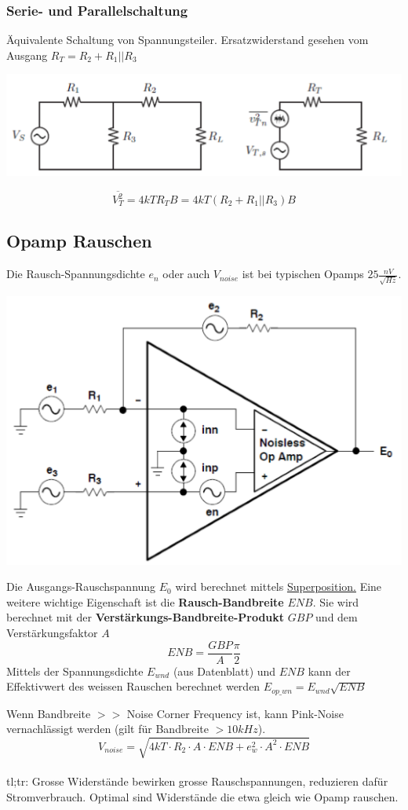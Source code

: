 \subsubsection{Serie- und Parallelschaltung}
Äquivalente Schaltung von Spannungsteiler. Ersatzwiderstand gesehen vom Ausgang $R_T = R_2 + R_1||R_3$
\begin{center}
	\includegraphics[width=0.6\columnwidth]{Images/rauschen_serie_parallel}
\end{center}
\[
\overline{V_T^2} = 4kTR_TB = 4kT(R_2 + R_1||R_3)B
\]


\subsection{Opamp Rauschen}
Die Rausch-Spannungsdichte $e_n$ oder auch $V_{noise}$ ist bei typischen Opamps $25\frac{nV}{\sqrt{Hz}}$.
\begin{center}
	\includegraphics[width=0.6\columnwidth]{Images/opamp_rauschen}
\end{center}
Die Ausgangs-Rauschspannung $E_0$ wird berechnet mittels \underline{Superposition.} Eine weitere wichtige Eigenschaft ist die \textbf{Rausch-Bandbreite} $ENB$. Sie wird berechnet mit der \textbf{Verstärkungs-Bandbreite-Produkt} $GBP$ und dem Verstärkungsfaktor $A$
\[
ENB = \frac{GBP}{A}\frac{\pi}{2}
\]
Mittels der Spannungsdichte $E_{wnd}$ (aus Datenblatt) und $ENB$ kann der Effektivwert des weissen Rauschen berechnet werden $E_{op\_wn} = E_{wnd}\sqrt{ENB}$

Wenn Bandbreite $>>$ Noise Corner Frequency ist, kann Pink-Noise vernachlässigt werden (gilt für Bandbreite $>10kHz$).
\[
V_{noise} = \sqrt{4kT\cdot R_2\cdot A\cdot ENB + e_{w}^2 \cdot A^2 \cdot ENB}
\]
~\\
tl;tr: Grosse Widerstände bewirken grosse Rauschspannungen, reduzieren dafür Stromverbrauch. Optimal sind Widerstände die etwa gleich wie Opamp rauschen.

